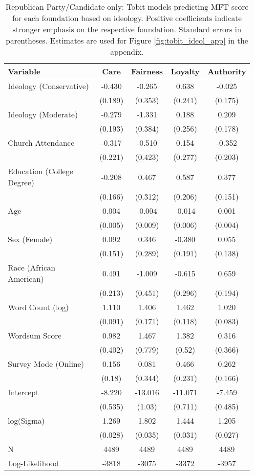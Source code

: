 \begin{table}[ht]
\centering
\caption{Republican Party/Candidate only: Tobit models predicting MFT score for each foundation based 
           on ideology. Positive coefficients indicate stronger emphasis on the respective 
           foundation. Standard errors in parentheses. Estimates are used for  
           Figure \ref{fig:tobit_ideol_app} in the appendix.} 
\label{tab:tobit_rep}
\begingroup\footnotesize
\begin{tabular}{lcccc}
  \hline
Variable & Care & Fairness & Loyalty & Authority \\ 
  \hline
Ideology (Conservative) & -0.430 &  -0.265 &   0.638 & -0.025 \\ 
   & (0.189) & (0.353) & (0.241) & (0.175) \\ 
  Ideology (Moderate) & -0.279 &  -1.331 &   0.188 &  0.209 \\ 
   & (0.193) & (0.384) & (0.256) & (0.178) \\ 
  Church Attendance & -0.317 &  -0.510 &   0.154 & -0.352 \\ 
   & (0.221) & (0.423) & (0.277) & (0.203) \\ 
  Education (College Degree) & -0.208 &   0.467 &   0.587 &  0.377 \\ 
   & (0.166) & (0.312) & (0.206) & (0.151) \\ 
  Age &  0.004 &  -0.004 &  -0.014 &  0.001 \\ 
   & (0.005) & (0.009) & (0.006) & (0.004) \\ 
  Sex (Female) &  0.092 &   0.346 &  -0.380 &  0.055 \\ 
   & (0.151) & (0.289) & (0.191) & (0.138) \\ 
  Race (African American) &  0.491 &  -1.009 &  -0.615 &  0.659 \\ 
   & (0.213) & (0.451) & (0.296) & (0.194) \\ 
  Word Count (log) &  1.110 &   1.406 &   1.462 &  1.020 \\ 
   & (0.091) & (0.171) & (0.118) & (0.083) \\ 
  Wordsum Score &  0.982 &   1.467 &   1.382 &  0.316 \\ 
   & (0.402) & (0.779) & (0.52) & (0.366) \\ 
  Survey Mode (Online) &  0.156 &   0.081 &   0.466 &  0.262 \\ 
   & (0.18) & (0.344) & (0.231) & (0.166) \\ 
  Intercept & -8.220 & -13.016 & -11.071 & -7.459 \\ 
   & (0.535) & (1.03) & (0.711) & (0.485) \\ 
  log(Sigma) &  1.269 &   1.802 &   1.444 &  1.205 \\ 
   & (0.028) & (0.035) & (0.031) & (0.027) \\ 
   \hline
N & 4489 & 4489 & 4489 & 4489 \\ 
  Log-Likelihood & -3818 & -3075 & -3372 & -3957 \\ 
   \hline
\end{tabular}
\endgroup
\end{table}
